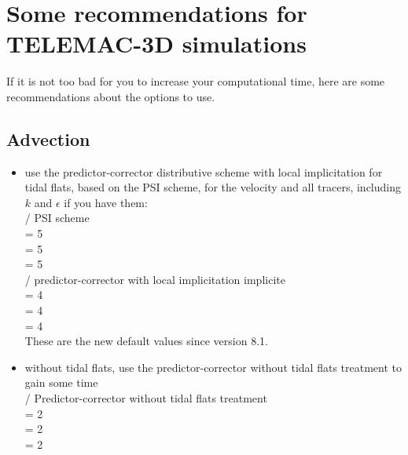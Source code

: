 \chapter{Some recommendations for TELEMAC-3D simulations}

If it is not too bad for you to increase your computational time,
here are some recommendations about the options to use.

\section{Advection}
\begin{itemize}
\item use the predictor-corrector distributive scheme with local implicitation for tidal flats,
based on the PSI scheme, for the velocity and all tracers, including $k$ and $\epsilon$
if you have them:\\
  / PSI scheme\\
   = 5\\
   = 5\\
   = 5\\
  / predictor-corrector with local implicitation implicite\\
   = 4\\
   = 4\\
   = 4\\
These are the new default values since version 8.1.\\
\item without tidal flats, use the predictor-corrector without tidal flats treatment to gain some time\\
  / Predictor-corrector without tidal flats treatment\\
   = 2\\
   = 2\\
   = 2\\
\end{itemize}
